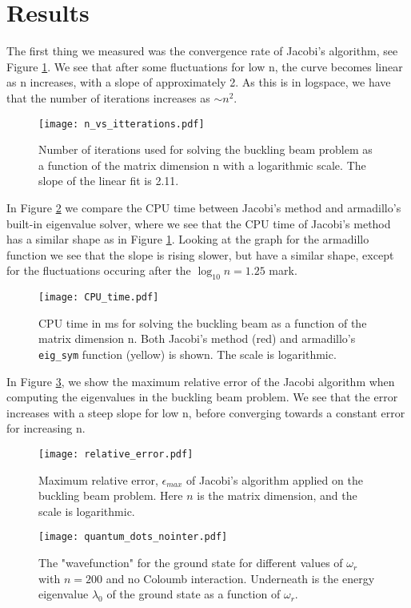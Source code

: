 \section{Results}
\label{sec:results}

The first thing we measured was the convergence rate of Jacobi's algorithm, see Figure \ref{fig:n_vs_it}.
We see that after some fluctuations for low n, the curve becomes linear as n increases, with a slope of approximately 2.
As this is in logspace, we have that the number of iterations increases as $\sim  n^2$.
\begin{figure}[htbp]
	\centering
	\texttt{[image: n\_vs\_itterations.pdf]}
	\caption{Number of iterations used for solving the buckling beam problem as a function of the matrix dimension n with a logarithmic scale. The slope of the linear fit is 2.11.}
	\label{fig:n_vs_it}
\end{figure}

In Figure \ref{fig:CPUtime} we compare the CPU time between Jacobi's method and
armadillo's built-in eigenvalue solver, where we see that the CPU time of Jacobi's method
has a similar shape as in Figure \ref{fig:n_vs_it}. Looking at the graph for the armadillo
function we see that the slope is rising slower, but have a similar shape, except
for the fluctuations occuring after the $\log_{10} n = 1.25$ mark. 
\begin{figure}[htbp]
	\centering
	\texttt{[image: CPU\_time.pdf]}
	\caption{CPU time in ms for solving the buckling beam as a function of the matrix dimension n. Both Jacobi's method (red) and armadillo's \texttt{eig\_sym} function (yellow) is shown. The scale is logarithmic.}
	\label{fig:CPUtime}
\end{figure}

In Figure \ref{fig:error}, we show the maximum relative error of the Jacobi
algorithm when computing the eigenvalues in the buckling beam problem. We see that the error increases with a steep slope for low n,
before converging towards a constant error for increasing n.
\begin{figure}[htbp]
	\centering
	\texttt{[image: relative\_error.pdf]}
	\caption{Maximum relative error, $\epsilon_{max}$ of Jacobi's algorithm applied on the buckling beam problem.
	Here $n$ is the matrix dimension, and the scale is logarithmic.}
	\label{fig:error}
\end{figure}


\begin{figure}[htbp]
	\centering
	\texttt{[image: quantum\_dots\_nointer.pdf]}
	\caption{The "wavefunction" for the ground state for different values of $\omega_r$ with $n=200$ and no Coloumb interaction.
	Underneath is the energy eigenvalue $\lambda_0$ of the ground state as a function of $\omega_r$.}
	\label{fig:quantum_dots_nointer}
\end{figure}

